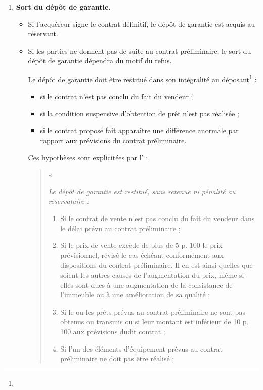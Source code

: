 \begin{enumerate}
					\item \textbf{Sort du dépôt de garantie.}

						\begin{itemize}
							\item Si l’acquéreur signe le contrat définitif, le dépôt de garantie est acquis au réservant.

							\item Si les parties ne donnent pas de suite au contrat préliminaire, le sort du dépôt de garantie dépendra du motif du refus.

								Le dépôt de garantie doit être restitué dans son intégralité au déposant\footnote{} :
								\begin{itemize}
									\item si le contrat n'est pas conclu du fait du vendeur ;
									\item si la condition suspensive d’obtention de prêt n'est pas réalisée ;
									\item si le contrat proposé fait apparaître une différence anormale par rapport aux prévisions du contrat préliminaire.
								\end{itemize}

								Ces hypothèses sont explicitées par l’ :
								\begin{quote}
									« {\itshape Le dépôt de garantie est restitué, sans retenue ni pénalité au réservataire :
									\begin{enumerate}[label=\alph*)]
										\item Si le contrat de vente n'est pas conclu du fait du vendeur dans le délai prévu au contrat préliminaire ;

										\item Si le prix de vente excède de plus de 5 p. 100 le prix prévisionnel, révisé le cas échéant conformément aux dispositions du contrat préliminaire. Il en est ainsi quelles que soient les autres causes de l'augmentation du prix, même si elles sont dues à une augmentation de la consistance de l'immeuble ou à une amélioration de sa qualité ;

										\item Si le ou les prêts prévus au contrat préliminaire ne sont pas obtenus ou transmis ou si leur montant est inférieur de 10 p. 100 aux prévisions dudit contrat ;

										\item Si l'un des éléments d'équipement prévus au contrat préliminaire ne doit pas être réalisé ;


\end{enumerate}}
\end{quote}
\end{itemize}
\end{enumerate}
